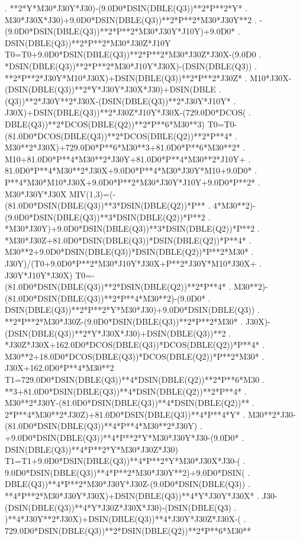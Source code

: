 \begin{framedverbatim}
     . **2*Y*M30*J30Y*J30)-(9.0D0*DSIN(DBLE(Q3))**2*P**2*Y*
     . M30*J30X*J30)+9.0D0*DSIN(DBLE(Q3))**2*P**2*M30*J30Y**2
     . -(9.0D0*DSIN(DBLE(Q3))**2*P**2*M30*J30Y*J10Y)+9.0D0*
     . DSIN(DBLE(Q3))**2*P**2*M30*J30Z*J10Y
      T0=T0+9.0D0*DSIN(DBLE(Q3))**2*P**2*M30*J30Z*J30X-(9.0D0
     . *DSIN(DBLE(Q3))**2*P**2*M30*J10Y*J30X)-(DSIN(DBLE(Q3))
     . **2*P**2*J30Y*M10*J30X)+DSIN(DBLE(Q3))**2*P**2*J30Z*
     . M10*J30X-(DSIN(DBLE(Q3))**2*Y*J30Y*J30X*J30)+DSIN(DBLE
     . (Q3))**2*J30Y**2*J30X-(DSIN(DBLE(Q3))**2*J30Y*J10Y*
     . J30X)+DSIN(DBLE(Q3))**2*J30Z*J10Y*J30X-(729.0D0*DCOS(
     . DBLE(Q3))**2*DCOS(DBLE(Q2))**2*P**6*M30**3)
      T0=T0-(81.0D0*DCOS(DBLE(Q3))**2*DCOS(DBLE(Q2))**2*P**4*
     . M30**2*J30X)+729.0D0*P**6*M30**3+81.0D0*P**6*M30**2*
     . M10+81.0D0*P**4*M30**2*J30Y+81.0D0*P**4*M30**2*J10Y+
     . 81.0D0*P**4*M30**2*J30X+9.0D0*P**4*M30*J30Y*M10+9.0D0*
     . P**4*M30*M10*J30X+9.0D0*P**2*M30*J30Y*J10Y+9.0D0*P**2*
     . M30*J30Y*J30X
      MIV(1,3)=(-(81.0D0*DSIN(DBLE(Q3))**3*DSIN(DBLE(Q2))*P**
     . 4*M30**2)-(9.0D0*DSIN(DBLE(Q3))**3*DSIN(DBLE(Q2))*P**2
     . *M30*J30Y)+9.0D0*DSIN(DBLE(Q3))**3*DSIN(DBLE(Q2))*P**2
     . *M30*J30Z+81.0D0*DSIN(DBLE(Q3))*DSIN(DBLE(Q2))*P**4*
     . M30**2+9.0D0*DSIN(DBLE(Q3))*DSIN(DBLE(Q2))*P**2*M30*
     . J30Y)/(T0+9.0D0*P**2*M30*J10Y*J30X+P**2*J30Y*M10*J30X+
     . J30Y*J10Y*J30X)
      T0=-(81.0D0*DSIN(DBLE(Q3))**2*DSIN(DBLE(Q2))**2*P**4*
     . M30**2)-(81.0D0*DSIN(DBLE(Q3))**2*P**4*M30**2)-(9.0D0*
     . DSIN(DBLE(Q3))**2*P**2*Y*M30*J30)+9.0D0*DSIN(DBLE(Q3))
     . **2*P**2*M30*J30Z-(9.0D0*DSIN(DBLE(Q3))**2*P**2*M30*
     . J30X)-(DSIN(DBLE(Q3))**2*Y*J30X*J30)+DSIN(DBLE(Q3))**2
     . *J30Z*J30X+162.0D0*DCOS(DBLE(Q3))*DCOS(DBLE(Q2))*P**4*
     . M30**2+18.0D0*DCOS(DBLE(Q3))*DCOS(DBLE(Q2))*P**2*M30*
     . J30X+162.0D0*P**4*M30**2
      T1=729.0D0*DSIN(DBLE(Q3))**4*DSIN(DBLE(Q2))**2*P**6*M30
     . **3+81.0D0*DSIN(DBLE(Q3))**4*DSIN(DBLE(Q2))**2*P**4*
     . M30**2*J30Y-(81.0D0*DSIN(DBLE(Q3))**4*DSIN(DBLE(Q2))**
     . 2*P**4*M30**2*J30Z)+81.0D0*DSIN(DBLE(Q3))**4*P**4*Y*
     . M30**2*J30-(81.0D0*DSIN(DBLE(Q3))**4*P**4*M30**2*J30Y)
     . +9.0D0*DSIN(DBLE(Q3))**4*P**2*Y*M30*J30Y*J30-(9.0D0*
     . DSIN(DBLE(Q3))**4*P**2*Y*M30*J30Z*J30)
      T1=T1+9.0D0*DSIN(DBLE(Q3))**4*P**2*Y*M30*J30X*J30-(
     . 9.0D0*DSIN(DBLE(Q3))**4*P**2*M30*J30Y**2)+9.0D0*DSIN(
     . DBLE(Q3))**4*P**2*M30*J30Y*J30Z-(9.0D0*DSIN(DBLE(Q3))
     . **4*P**2*M30*J30Y*J30X)+DSIN(DBLE(Q3))**4*Y*J30Y*J30X*
     . J30-(DSIN(DBLE(Q3))**4*Y*J30Z*J30X*J30)-(DSIN(DBLE(Q3)
     . )**4*J30Y**2*J30X)+DSIN(DBLE(Q3))**4*J30Y*J30Z*J30X-(
     . 729.0D0*DSIN(DBLE(Q3))**2*DSIN(DBLE(Q2))**2*P**6*M30**

\end{framedverbatim}
